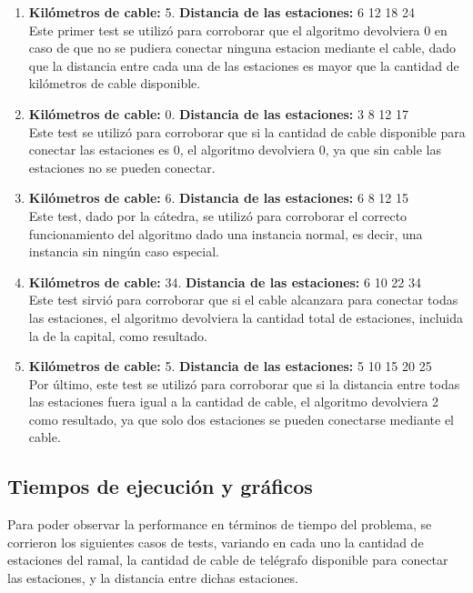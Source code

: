 \documentclass[10pt, a4paper]{article}
\begin{document}
\begin{enumerate}
	\item \textbf{Kil\'ometros de cable:} 5. \textbf{Distancia de las estaciones:} 6 12 18 24\\
	Este primer test se utiliz\'o para corroborar que el algoritmo devolviera 0 en caso de que no se pudiera conectar ninguna estacion mediante el cable, dado que la distancia entre cada una de las estaciones es mayor que la cantidad de kil\'ometros de cable disponible.
	
	\item \textbf{Kil\'ometros de cable:} 0. \textbf{Distancia de las estaciones:} 3 8 12 17\\
	Este test se utiliz\'o para corroborar que si la cantidad de cable disponible para conectar las estaciones es 0, el algoritmo devolviera 0, ya que sin cable las estaciones no se pueden conectar.
	
	\item \textbf{Kil\'ometros de cable:} 6. \textbf{Distancia de las estaciones:} 6 8 12 15\\
	Este test, dado por la c\'atedra, se utiliz\'o para corroborar el correcto funcionamiento del algoritmo dado una instancia normal, es decir, una instancia sin ning\'un caso especial.
	
	\item \textbf{Kil\'ometros de cable:} 34. \textbf{Distancia de las estaciones:} 6 10 22 34\\
	Este test sirvi\'o para corroborar que si el cable alcanzara para conectar todas las estaciones, el algoritmo devolviera la cantidad total de estaciones, incluida la de la capital, como resultado. 
	
	\item \textbf{Kil\'ometros de cable:} 5. \textbf{Distancia de las estaciones:} 5 10 15 20 25\\
	Por \'ultimo, este test se utiliz\'o para corroborar que si la distancia entre todas las estaciones fuera igual a la cantidad de cable, el algoritmo devolviera 2 como resultado, ya que solo dos estaciones se pueden conectarse mediante el cable.
\end{enumerate}

\subsection{Tiempos de ejecuci\'on y gr\'aficos}

Para poder observar la performance en t\'erminos de tiempo del problema, se corrieron los siguientes casos de tests, variando en cada uno la cantidad de estaciones del ramal, la cantidad de cable de tel\'egrafo disponible para conectar las estaciones, y la distancia entre dichas estaciones.
\end{document}
